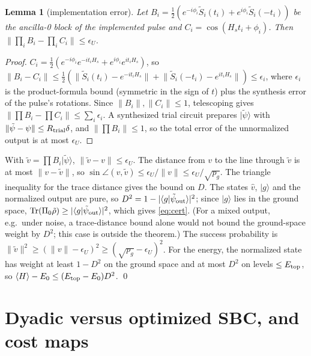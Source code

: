 \documentclass[aps,pra,twocolumn,superscriptaddress,nofootinbib]{revtex4-2}
\newtheorem{lemma}{Lemma}
\newcommand{\ket}[1]{|#1\rangle}
\newcommand{\norm}[1]{\lVert#1\rVert}
\begin{document}
\begin{lemma}[implementation error]
Let $B_i=\frac12(e^{-i\phi_i}\tilde S_i(t_i)+e^{i\phi_i}\tilde S_i(-t_i))$ be the ancilla-0 block of the
implemented pulse and $C_i=\cos(H_st_i+\phi_i)$. Then
$\norm{\prod_iB_i-\prod_iC_i}\le\epsilon_U$.
\end{lemma}
\begin{proof}
$C_i=\frac12(e^{-i\phi_i}e^{-it_iH_s}+e^{i\phi_i}e^{it_iH_s})$, so
$\norm{B_i-C_i}\le\frac12(\norm{\tilde S_i(t_i)-e^{-it_iH_s}}+\norm{\tilde S_i(-t_i)-e^{it_iH_s}})\le\epsilon_i$,
where $\epsilon_i$ is the product-formula bound (symmetric in the sign of $t$) plus the synthesis error
of the pulse's rotations. Since $\norm{B_i},\norm{C_i}\le1$, telescoping gives
$\norm{\prod B_i-\prod C_i}\le\sum_i\epsilon_i$. A synthesized trial circuit prepares $\ket{\tilde\psi}$
with $\norm{\tilde\psi-\psi}\le R_{\rm trial}\delta$, and $\norm{\prod B_i}\le1$, so the total error of the
unnormalized output is at most $\epsilon_U$.
\end{proof}

With $\tilde v=\prod B_i\ket{\tilde\psi}$, $\norm{\tilde v-v}\le\epsilon_U$. The distance from $v$ to the line
through $\tilde v$ is at most $\norm{v-\tilde v}$, so $\sin\angle(v,\tilde v)\le\epsilon_U/\norm v\le
\epsilon_U/\sqrt{p_g}$. The triangle inequality for the trace distance gives the bound on $D$. The
states $\hat v$, $\ket g$ and the normalized output are pure, so $D^2=1-|\langle g|\tilde\psi_{\rm out}\rangle|^2$;
since $\ket g$ lies in the ground space, $\operatorname{Tr}(\Pi_0\tilde\rho)\ge|\langle g|\tilde\psi_{\rm out}\rangle|^2$,
which gives \eqref{eq:cert}. (For a mixed output, e.g.\ under noise, a trace-distance bound alone would
not bound the ground-space weight by $D^2$; this case is outside the theorem.) The
success probability is $\norm{\tilde v}^2\ge(\norm v-\epsilon_U)^2\ge(\sqrt{p_g}-\epsilon_U)^2$. For
the energy, the normalized state has weight at least $1-D^2$ on the ground space and at most $D^2$ on
levels $\le E_{\rm top}$, so $\langle H\rangle-E_0\le(E_{\rm top}-E_0)D^2$. \qed

\section{Dyadic versus optimized SBC, and cost maps}
\label{app:dyaopt}\label{sec:dyaopt}
\end{document}
